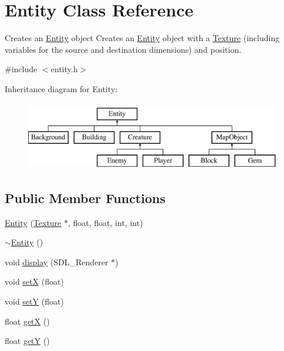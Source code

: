 \hypertarget{class_entity}{\section{Entity Class Reference}
\label{class_entity}
}


Creates an \hyperlink{class_entity}{Entity} object Creates an \hyperlink{class_entity}{Entity} object with a \hyperlink{class_texture}{Texture} (including variables for the source and destination dimensions) and position.  




{\ttfamily \#include $<$entity.\+h$>$}

Inheritance diagram for Entity\+:\begin{figure}[H]
\begin{center}
\leavevmode
\includegraphics[height=3.000000cm]{class_entity}
\end{center}
\end{figure}
\subsection*{Public Member Functions}
\begin{DoxyCompactItemize}
\item 
\hyperlink{class_entity_a8a572d724b689de57d3c0d8bafeff107}{Entity} (\hyperlink{class_texture}{Texture} $\ast$, float, float, int, int)
\item 
\hyperlink{class_entity_adf6d3f7cb1b2ba029b6b048a395cc8ae}{$\sim$\+Entity} ()
\item 
void \hyperlink{class_entity_a2224871711ac97a54af338ddefc25ac9}{display} (S\+D\+L\+\_\+\+Renderer $\ast$)
\item 
void \hyperlink{class_entity_a38e2f110d39426ba4823296b4294dd74}{set\+X} (float)
\item 
void \hyperlink{class_entity_a8896110a266bdec69b14d34ec6374df8}{set\+Y} (float)
\item 
float \hyperlink{class_entity_abc5b6d26c039bf3bf6faa766990768b4}{get\+X} ()
\item 
float \hyperlink{class_entity_ab6dd7b404c13754202acfe3d2c65c77b}{get\+Y} ()
\end{DoxyCompactItemize}
